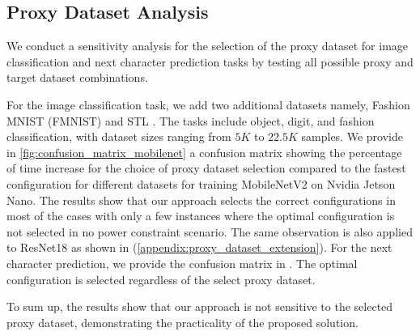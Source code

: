 \subsection{Proxy Dataset Analysis}

We conduct a sensitivity analysis for the selection of the proxy dataset for image classification and next character prediction tasks by testing all possible proxy and target dataset combinations. 

For the image classification task, we add two additional datasets namely, Fashion MNIST \cite{fashion_mnist_cite} (FMNIST)  and STL \cite{STL_cite}. The tasks include object, digit, and fashion classification, with dataset sizes ranging from $5K$ to $22.5K$ samples. We provide in \cref{fig:confusion_matrix_mobilenet} a confusion matrix showing the percentage of time increase for the choice of proxy dataset selection compared to the fastest configuration for different datasets for training MobileNetV2 on Nvidia Jetson Nano. The results show that our approach selects the correct configurations in most of the cases with only a few instances where the optimal configuration is not selected in no power constraint scenario. The same observation is also applied to ResNet18 as shown in  (\cref{appendix:proxy_dataset_extension}). For the next character prediction, we provide the confusion matrix in . The optimal configuration is selected regardless of the select proxy dataset.


To sum up, the results show that our approach is not sensitive to the selected proxy dataset, demonstrating the practicality of the proposed solution.


